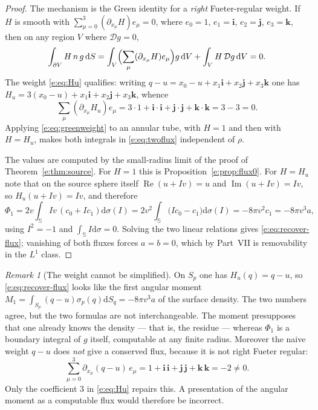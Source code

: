 \documentclass[11pt,a4paper]{article}
\numberwithin{equation}{section}
\theoremstyle{definition}
\theoremstyle{remark}
\newtheorem{remark}[theorem]{Remark}
\theoremstyle{plain}
\newcommand{\SSS}{\mathbb S}
\DeclareMathOperator{\Rea}{Re}
\DeclareMathOperator{\Ima}{Im}
\newcommand{\Dop}{\mathcal D}
\newcommand{\Sp}{S_{p}}
\newcommand{\dd}{\mathrm d}
\begin{document}
\begin{proof}
The mechanism is the Green identity for a \emph{right} Fueter-regular
weight. If $H$ is smooth with $\sum_{\mu=0}^3(\partial_{x_\mu}H)e_\mu=0$,
where $e_0=1$, $e_1=\mathbf i$, $e_2=\mathbf j$, $e_3=\mathbf k$, then on
any region $V$ where $\Dop g=0$,
\begin{equation}
 \int_{\partial V}H\,n\,g\,\dd S
 =\int_V\Bigl(\sum_\mu(\partial_{x_\mu}H)e_\mu\Bigr)g\,\dd V
   +\int_VH\,\Dop g\,\dd V=0.
 \label{e:eq:greenweight}
\end{equation}
The weight \eqref{e:eq:Hu} qualifies: writing $q-u=x_0-u+x_1\mathbf
i+x_2\mathbf j+x_3\mathbf k$ one has $H_u=3(x_0-u)+x_1\mathbf
i+x_2\mathbf j+x_3\mathbf k$, whence
\[
 \sum_\mu(\partial_{x_\mu}H_u)e_\mu
   =3\cdot1+\mathbf i\cdot\mathbf i+\mathbf j\cdot\mathbf j
     +\mathbf k\cdot\mathbf k=3-3=0 .
\]
Applying \eqref{e:eq:greenweight} to an annular tube, with $H=1$ and then
with $H=H_u$, makes both integrals in \eqref{e:eq:twoflux} independent of
$\rho$.

The values are computed by the small-radius limit of the proof of
Theorem~\ref{e:thm:source}. For $H=1$ this is
Proposition~\ref{e:prop:flux0}. For $H=H_u$ note that on the source
sphere itself $\Rea(u+Iv)=u$ and $\Ima(u+Iv)=Iv$, so
$H_u(u+Iv)=Iv$, and therefore
\[
 \Phi_1=2v\int_{\SSS}Iv\,(c_0+Ic_1)\dd\sigma(I)
      =2v^2\int_{\SSS}\bigl(Ic_0-c_1\bigr)\dd\sigma(I)
      =-8\pi v^2c_1=-8\pi v^3a,
\]
using $I^2=-1$ and $\int_{\SSS}I\dd\sigma=0$. Solving the two linear
relations gives \eqref{e:eq:recover-flux}; vanishing of both fluxes
forces $a=b=0$, which by Part~VII is removability in the $L^1$ class.
\end{proof}

\begin{remark}[The weight cannot be simplified]
\label{e:rem:naiveweight}
On $\Sp$ one has $H_u(q)=q-u$, so \eqref{e:eq:recover-flux} looks like
the first angular moment
$M_1=\int_{\Sp}(q-u)\sigma_p(q)\dd S_q=-8\pi v^3a$ of the surface
density. The two numbers agree, but the two formulas are not
interchangeable. The moment presupposes that one already knows the
density --- that is, the residue --- whereas $\Phi_1$ is a boundary
integral of $g$ itself, computable at any finite radius. Moreover the
naive weight $q-u$ does \emph{not} give a conserved flux, because it is
not right Fueter regular:
\[
 \sum_{\mu=0}^3\partial_{x_\mu}(q-u)\,e_\mu
 =1+\mathbf i\,\mathbf i+\mathbf j\,\mathbf j+\mathbf k\,\mathbf k=-2\ne0 .
\]
Only the coefficient $3$ in \eqref{e:eq:Hu} repairs this. A presentation
of the angular moment as a computable flux would therefore be incorrect.
\end{remark}
\end{document}
